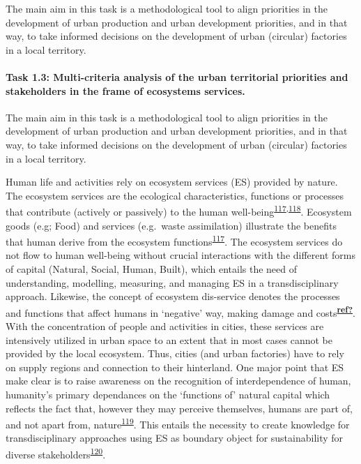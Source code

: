 \documentclass[
  12pt,
  a4paperpaper,
  onecolumn]{article}
\let\oldparagraph\paragraph
\renewcommand{\paragraph}[1]{\oldparagraph{#1}\mbox{}}
\let\paragraph\oldparagraph
\begin{document}
The main aim in this task is a methodological tool to align priorities
in the development of urban production and urban development priorities,
and in that way, to take informed decisions on the development of urban
(circular) factories in a local territory.

\hypertarget{task-1.3-multi-criteria-analysis-of-the-urban-territorial-priorities-and-stakeholders-in-the-frame-of-ecosystems-services.}{%
\paragraph{Task 1.3: Multi-criteria analysis of the urban territorial
priorities and stakeholders in the frame of ecosystems
services.}\label{task-1.3-multi-criteria-analysis-of-the-urban-territorial-priorities-and-stakeholders-in-the-frame-of-ecosystems-services.}}

The main aim in this task is a methodological tool to align priorities
in the development of urban production and urban development priorities,
and in that way, to take informed decisions on the development of urban
(circular) factories in a local territory.

Human life and activities rely on ecosystem services (ES) provided by
nature. The ecosystem services are the ecological characteristics,
functions or processes that contribute (actively or passively) to the
human
well-being\textsuperscript{\protect\hyperlink{ref-Costanza1997}{117},\protect\hyperlink{ref-Costanza2017}{118}}.
Ecosystem goods (e.g; Food) and services (e.g.~waste assimilation)
illustrate the benefits that human derive from the ecosystem
functions\textsuperscript{\protect\hyperlink{ref-Costanza1997}{117}}.
The ecosystem services do not flow to human well-being without crucial
interactions with the different forms of capital (Natural, Social,
Human, Built), which entails the need of understanding, modelling,
measuring, and managing ES in a transdisciplinary approach. Likewise,
the concept of ecosystem dis-service denotes the processes and functions
that affect humans in `negative' way, making damage and
costs\textsuperscript{\protect\hyperlink{ref-ref}{\textbf{ref?}}}. With
the concentration of people and activities in cities, these services are
intensively utilized in urban space to an extent that in most cases
cannot be provided by the local ecosystem. Thus, cities (and urban
factories) have to rely on supply regions and connection to their
hinterland. One major point that ES make clear is to raise awareness on
the recognition of interdependence of human, humanity's primary
dependances on the `functions of' natural capital which reflects the
fact that, however they may perceive themselves, humans are part of, and
not apart from,
nature\textsuperscript{\protect\hyperlink{ref-Ekins2003}{119}}. This
entails the necessity to create knowledge for transdisciplinary
approaches using ES as boundary object for sustainability for diverse
stakeholders\textsuperscript{\protect\hyperlink{ref-Honeck2021}{120}}.
\end{document}
